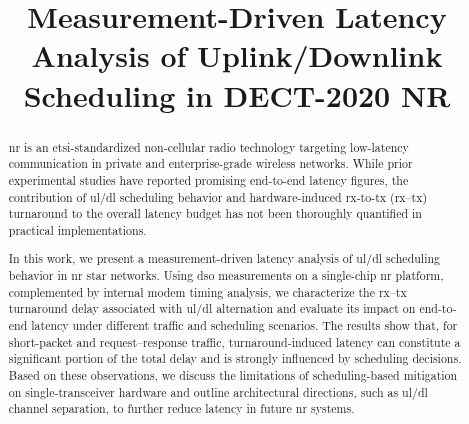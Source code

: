 \documentclass[conference]{IEEEtran}
\begin{document}
\title{Measurement-Driven Latency Analysis of Uplink/Downlink Scheduling in DECT-2020 NR
 }

\author{
\and
{}
\and
{}
}

\maketitle

\begin{abstract}


\gls{nr} is an \gls{etsi}-standardized non-cellular radio technology targeting low-latency communication in private and enterprise-grade wireless networks. 
While prior experimental studies have reported promising end-to-end latency figures, the contribution of \gls{ul}/\gls{dl} scheduling behavior and hardware-induced \gls{rx}-to-\gls{tx} (\gls{rx}--\gls{tx}) turnaround to the overall latency budget has not been thoroughly quantified in practical implementations.

In this work, we present a measurement-driven latency analysis of \gls{ul}/\gls{dl} scheduling behavior in \gls{nr} star networks. Using \gls{dso} measurements on a single-chip \gls{nr} platform, complemented by internal modem timing analysis, we characterize the \gls{rx}--\gls{tx} turnaround delay associated with \gls{ul}/\gls{dl} alternation and evaluate its impact on end-to-end latency under different traffic and scheduling scenarios. The results show that, for short-packet and request--response traffic, turnaround-induced latency can constitute a significant portion of the total delay and is strongly influenced by scheduling decisions. Based on these observations, we discuss the limitations of scheduling-based mitigation on single-transceiver hardware and outline architectural directions, such as \gls{ul}/\gls{dl} channel separation, to further reduce latency in future \gls{nr} systems.
\end{abstract}
\end{document}
